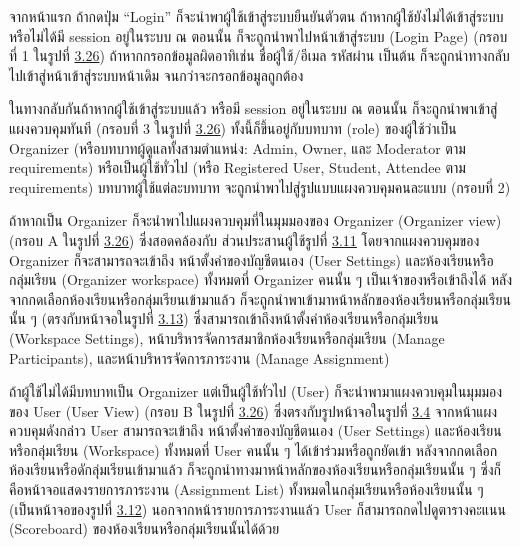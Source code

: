 \documentclass[12pt,oneside,openright,a4paper]{cpe-thai-project}
\begin{document}
        \begin{flushleft}
        จากหน้าแรก ถ้ากดปุ่ม “Login” ก็จะนำพาผู้ใช้เข้าสู่ระบบยืนยันตัวตน ถ้าหากผู้ใช้ยังไม่ได้เข้าสู่ระบบหรือไม่ได้มี session อยู่ในระบบ ณ ตอนนั้น ก็จะถูกนำพาไปหน้าเข้าสู่ระบบ (Login Page) (กรอบที่ 1 ในรูปที่ \hyperlink{nav-map}{3.26}) ถ้าหากกรอกข้อมูลผิดอาทิเช่น ชื่อผู้ใช้/อีเมล รหัสผ่าน เป็นต้น ก็จะถูกนำทางกลับไปเข้าสู่หน้าเข้าสู่ระบบหน้าเดิม จนกว่าจะกรอกข้อมูลถูกต้อง
        \end{flushleft}
        \begin{flushleft}
        ในทางกลับกันถ้าหากผู้ใช้เข้าสู่ระบบแล้ว หรือมี session อยู่ในระบบ ณ ตอนนั้น ก็จะถูกนำพาเข้าสู่แผงควบคุมทันที (กรอบที่ 3 ในรูปที่ \hyperlink{nav-map}{3.26}) ทั้งนี้ก็ขึ้นอยู่กับบทบาท (role) ของผู้ใช้ว่าเป็น Organizer (หรือบทบาทผู้ดูแลทั้งสามตำแหน่ง: Admin, Owner, และ Moderator ตาม requirements) หรือเป็นผู้ใช้ทั่วไป (หรือ Registered User, Student, Attendee ตาม requirements) บทบาทผู้ใช้แต่ละบทบาท จะถูกนำพาไปสู่รูปแบบแผงควบคุมคนละแบบ (กรอบที่ 2)  
        \end{flushleft}
        \begin{flushleft}
        ถ้าหากเป็น Organizer ก็จะนำพาไปแผงควบคุมที่ในมุมมองของ Organizer (Organizer view) (กรอบ A ในรูปที่ \hyperlink{nav-map}{3.26}) ซึ่งสอดคล้องกับ ส่วนประสานผู้ใช้รูปที่ \hyperlink{ui-org-dashboard1}{3.11} โดยจากแผงควบคุมของ Organizer ก็จะสามารถจะเข้าถึง หน้าตั้งค่าของบัญชีตนเอง (User Settings) และห้องเรียนหรือกลุ่มเรียน (Organizer workspace) ทั้งหมดที่ Organizer คนนั้น ๆ เป็นเจ้าของหรือเข้าถึงได้ หลังจากกดเลือกห้องเรียนหรือกลุ่มเรียนเข้ามาแล้ว ก็จะถูกนำพาเข้ามาหน้าหลักของห้องเรียนหรือกลุ่มเรียนนั้น ๆ (ตรงกับหน้าจอในรูปที่ \hyperlink{ui-org-assign1}{3.13}) ซึ่งสามารถเข้าถึงหน้าตั้งค่าห้องเรียนหรือกลุ่มเรียน (Workspace Settings), หน้าบริหารจัดการสมาชิกห้องเรียนหรือกลุ่มเรียน (Manage Participants), และหน้าบริหารจัดการภาระงาน (Manage Assignment) 
        \end{flushleft}
        \begin{flushleft}
        ถ้าผู้ใช้ไม่ได้มีบทบาทเป็น Organizer แต่เป็นผู้ใช้ทั่วไป (User) ก็จะนำพามาแผงควบคุมในมุมมองของ User (User View) (กรอบ B ในรูปที่ \hyperlink{nav-map}{3.26}) ซึ่งตรงกับรูปหน้าจอในรูปที่ \hyperlink{ui-dashboard1}{3.4} จากหน้าแผงควบคุมดังกล่าว User สามารถจะเข้าถึง หน้าตั้งค่าของบัญชีตนเอง (User Settings) และห้องเรียนหรือกลุ่มเรียน (Workspace) ทั้งหมดที่ User คนนั้น ๆ ได้เข้าร่วมหรือถูกยัดเข้า หลังจากกดเลือกห้องเรียนหรือดักลุ่มเรียนเข้ามาแล้ว ก็จะถูกนำทางมาหน้าหลักของห้องเรียนหรือกลุ่มเรียนนั้น ๆ ซึ่งก็คือหน้าจอแสดงรายการภาระงาน (Assignment List) ทั้งหมดในกลุ่มเรียนหรือห้องเรียนนั้น ๆ (เป็นหน้าจอของรูปที่ \hyperlink{ui-assign1}{3.12}) นอกจากหน้ารายการภาระงานแล้ว User ก็สามารถกดไปดูตารางคะแนน (Scoreboard) ของห้องเรียนหรือกลุ่มเรียนนั้นได้ด้วย 
        \end{flushleft}
\end{document}
